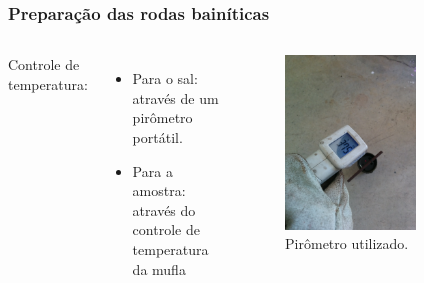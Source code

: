 \documentclass{beamer}
\begin{document}
\begin{frame}
\frametitle{Preparação das rodas bainíticas}

\begin{columns}[c] %
	Controle de temperatura:
	\begin{itemize}
		\item Para o sal: através de um pirômetro portátil.
		\item Para a amostra: através do controle de temperatura da mufla
	\end{itemize}
	
	\begin{figure}
		\centering
		\includegraphics[width=0.7\textwidth]{pirometro}
		\caption{Pirômetro utilizado.}
		\label{fig:pirometro}
	\end{figure}
\end{columns}
\end{frame}
\end{document}

